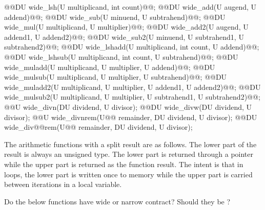 \begin{addedblock}
\begin{itemdecl}
@@DU wide_lsh(U multiplicand, int count)@@;
@@DU wide_add(U augend, U addend)@@;
@@DU wide_sub(U minuend, U subtrahend)@@;
@@DU wide_mul(U multiplicand, U multiplier)@@;
@@DU wide_add2(U augend, U addend1, U addend2)@@;
@@DU wide_sub2(U minuend, U subtrahend1, U subtrahend2)@@;
@@DU wide_lshadd(U multiplicand, int count, U addend)@@;
@@DU wide_lshsub(U multiplicand, int count, U subtrahend)@@;
@@DU wide_muladd(U multiplicand, U multiplier, U addend)@@;
@@DU wide_mulsub(U multiplicand, U multiplier, U subtrahend)@@;
@@DU wide_muladd2(U multiplicand, U multiplier, U addend1, U addend2)@@;
@@DU wide_mulsub2(U multiplicand, U multiplier, U subtrahend1, U subtrahend2)@@;
@@U wide_divn(DU dividend, U divisor);
@@DU wide_divw(DU dividend, U divisor);
@@U wide_divnrem(U@\tcode{\remmodif{*}\addmodif{\&}}@ remainder, DU dividend, U divisor);
@@DU wide_div@@rem(U@\tcode{\remmodif{*}\addmodif{\&}}@ remainder, DU dividend, U divisor);
\end{itemdecl}

The arithmetic functions with a split result are as follows. The lower part of the result is always an unsigned type. The lower part is returned through a pointer while the upper part is returned as the function result. The intent is that in loops, the lower part is written once to memory while the upper part is carried between iterations in a local variable.


\begin{modifcommentblock}
Do the below functions have wide or narrow contract? Should they be ?
\end{modifcommentblock}


\end{addedblock}

